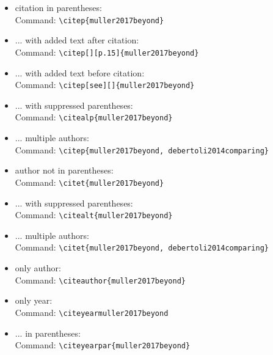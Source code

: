 \begin{itemize}
    \item citation in parentheses: \citep{muller2017beyond}\\
    Command: \texttt{\textbackslash citep\{muller2017beyond\}}
    
    \item ... with added text after citation: \citep[][p.15]{muller2017beyond}\\
    Command: \texttt{\textbackslash citep[][p.15]\{muller2017beyond\}}
    
    \item ... with added text before citation: \citep[see][]{muller2017beyond}\\
    Command: \texttt{\textbackslash citep[see][]\{muller2017beyond\}}
    
    \item ... with suppressed parentheses: \citealp{muller2017beyond}\\
    Command: \texttt{\textbackslash citealp\{muller2017beyond\}}
    
    \item ... multiple authors: \citep{muller2017beyond, debertoli2014comparing}\\
    Command: \texttt{\textbackslash citep\{muller2017beyond, debertoli2014comparing\}}
    
    \item author not in parentheses: \citet{muller2017beyond}\\
    Command: \texttt{\textbackslash citet\{muller2017beyond\}}
    
    \item ... with suppressed parentheses: \citealt{muller2017beyond}\\
    Command: \texttt{\textbackslash citealt\{muller2017beyond\}}
    
    \item ... multiple authors: \citet{muller2017beyond, debertoli2014comparing}\\
    Command: \texttt{\textbackslash citet\{muller2017beyond, debertoli2014comparing\}}
    
    \item only author: \citeauthor{muller2017beyond}\\
    Command: \texttt{\textbackslash citeauthor\{muller2017beyond\}}
    
    \item only year: \citeyear{muller2017beyond}\\
    Command: \texttt{\textbackslash citeyear{muller2017beyond}}
    
    \item ... in parentheses: \citeyearpar{muller2017beyond}\\
    Command: \texttt{\textbackslash citeyearpar\{muller2017beyond\}}
\end{itemize}